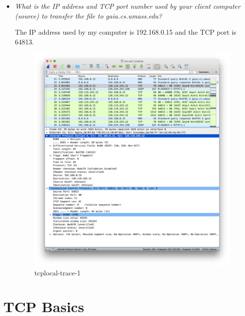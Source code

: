 \documentclass[11pt]{article}
\begin{document}
\begin{itemize}
	\item
		\textit{What is the IP address and TCP port number used by your client computer (source) to transfer the file to gaia.cs.umass.edu?}
		\par The IP address used by my computer is 192.168.0.15 and the TCP port is 64813.
		
		\begin{figure}[H]
		\centering
		\caption{tcplocal-trace-1}
		\includegraphics[width=400px]{02}
		\end{figure}
	
\end{itemize}

\pagebreak

\section{TCP Basics}
\end{document}

